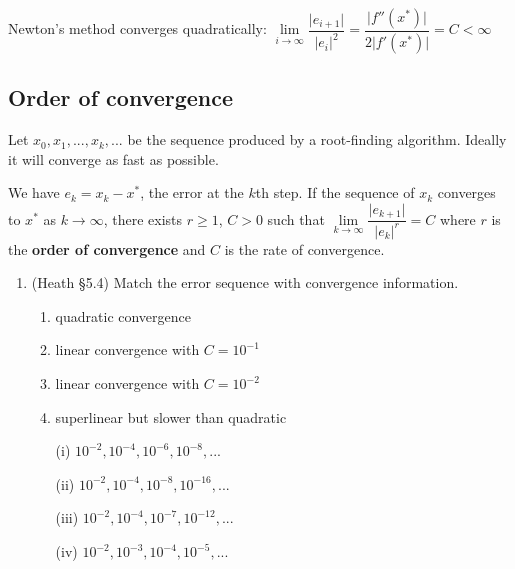 \documentclass[12pt,letterpaper,noanswers]{exam}
\begin{document}
        Newton's method converges quadratically: $\lim\limits_{i\rightarrow\infty} \dfrac{\vert e_{i+1}\vert }{\vert e_i\vert^2 } = \dfrac{\vert f''(x^*)\vert}{2\vert f'(x^*)\vert} = C < \infty$
 
\subsection*{Order of convergence}

\begin{tcolorbox}
Let $x_0, x_1, ..., x_k, ...$ be the sequence produced by a root-finding algorithm.  Ideally it will converge as fast as possible.

We have $e_k = x_k - x^*$, the error at the $k$th step.  If the sequence of $x_k$ converges to $x^*$ as $k\rightarrow\infty$, there exists $r\geq 1$, $C>0$ such that $\lim\limits_{k\rightarrow\infty}\dfrac{\vert e_{k+1}\vert}{\vert e_k\vert^r} = C$ where $r$ is the \textbf{order of convergence} and $C$ is the rate of convergence.
\end{tcolorbox}
   \begin{enumerate}[resume]
    \item (Heath \S 5.4) Match the error sequence with convergence information.
    
    \begin{enumerate}
    \item quadratic convergence
    \item linear convergence with $C = 10^{-1}$
    \item linear convergence with $C = 10^{-2}$
    \item superlinear but slower than quadratic
    \end{enumerate}
    
    \begin{enumerate}
    \item[(i)] $10^{-2},10^{-4},10^{-6},10^{-8},...$
    \item[(ii)] $10^{-2},10^{-4},10^{-8},10^{-16},...$
    \item[(iii)] $10^{-2},10^{-4},10^{-7},10^{-12},...$
    \item[(iv)] $10^{-2},10^{-3},10^{-4},10^{-5},...$
    \end{enumerate}
\end{enumerate}
\end{document}
